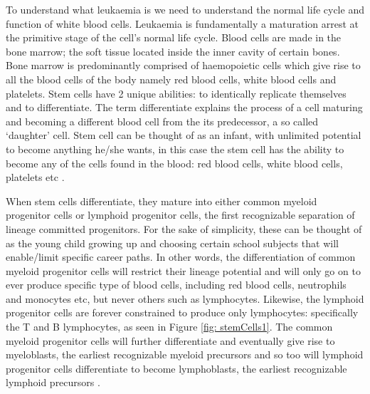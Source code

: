 \documentclass[a4paper,11pt]{article}
\begin{document}
To understand what leukaemia is we need to understand the normal life cycle and function of white blood cells. Leukaemia is fundamentally a maturation arrest at the primitive stage of the cell's normal life cycle. Blood cells are made in the bone marrow; the soft tissue located inside the inner cavity of certain bones\citep{Janeway}. Bone marrow is predominantly comprised of haemopoietic cells which give rise to all the blood cells of the body namely red blood cells, white blood cells and platelets. Stem cells have 2 unique abilities: to identically replicate themselves and to differentiate. The term differentiate explains the process of a cell maturing and becoming a different blood cell from the its predecessor, a so called ‘daughter’ cell. Stem cell can be thought of as an infant, with unlimited potential to become anything he/she wants, in this case the stem cell has the ability to become any of the cells found in the blood: red blood cells, white blood cells, platelets etc \cite{blood}. 

When stem cells differentiate, they mature into either common myeloid progenitor cells or lymphoid progenitor
cells, the first recognizable separation of lineage committed progenitors. For the sake of simplicity, these can be thought of as the young child growing up and choosing certain school subjects that will enable/limit specific career paths. In other words, the differentiation of common myeloid progenitor cells will restrict their lineage potential and will only go on to ever produce specific type of blood cells, including red blood cells, neutrophils and monocytes etc, but never others such as
lymphocytes. Likewise, the lymphoid progenitor cells are forever constrained to produce only
lymphocytes: specifically the T and B lymphocytes, as seen in Figure \ref{fig: stemCells1}. The common myeloid progenitor cells will further differentiate and eventually give rise to myeloblasts, the earliest recognizable myeloid precursors and so too will lymphoid progenitor cells differentiate to become lymphoblasts, the earliest recognizable lymphoid precursors \citep{Janeway}.
\end{document}
